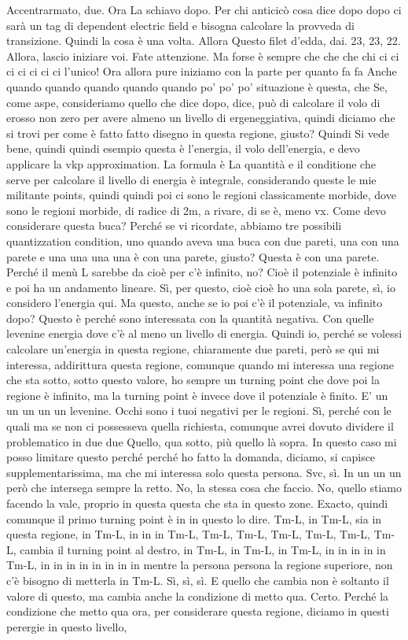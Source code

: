 \begin{soluzione}
   Accentrarmato, due. Ora La schiavo dopo. Per chi anticicò cosa dice dopo dopo ci sarà un tag di dependent electric field e bisogna calcolare la provveda di transizione. Quindi la cosa è una volta. Allora Questo filet d'edda, dai. 23, 23, 22. Allora, lascio iniziare voi. Fate attenzione. Ma forse è sempre che che che chi ci ci ci ci ci ci ci l'unico! Ora allora pure iniziamo con la parte per quanto fa fa Anche quando quando quando quando quando po' po' po' situazione è questa, che Se, come aspe, consideriamo quello che dice dopo, dice, può di calcolare il volo di erosso non zero per avere almeno un livello di ergeneggiativa, quindi diciamo che si trovi per come è fatto fatto disegno in questa regione, giusto? Quindi Si vede bene, quindi quindi esempio questa è l'energia, il volo dell'energia, e devo applicare la vkp approximation. La formula è La quantità e il conditione che serve per calcolare il livello di energia è integrale, considerando queste le mie militante points, quindi quindi poi ci sono le regioni classicamente morbide, dove sono le regioni morbide, di radice di 2m, a rivare, di se è, meno vx. Come devo considerare questa buca? Perché se vi ricordate, abbiamo tre possibili quantizzation condition, uno quando aveva una buca con due pareti, una con una parete e una una una una è con una parete, giusto? Questa è con una parete. Perché il menù L sarebbe da cioè per c'è infinito, no? Cioè il potenziale è infinito e poi ha un andamento lineare. Sì, per questo, cioè cioè ho una sola parete, sì, io considero l'energia qui. Ma questo, anche se io poi c'è il potenziale, va infinito dopo? Questo è perché sono interessata con la quantità negativa. Con quelle levenine energia dove c'è al meno un livello di energia. Quindi io, perché se volessi calcolare un'energia in questa regione, chiaramente due pareti, però se qui mi interessa, addirittura questa regione, comunque quando mi interessa una regione che sta sotto, sotto questo valore, ho sempre un turning point che dove poi la regione è infinito, ma la turning point è invece dove il potenziale è finito. E' un un un un un levenine. Occhi sono i tuoi negativi per le regioni. Sì, perché con le quali ma se non ci possesseva quella richiesta, comunque avrei dovuto dividere il problematico in due due Quello, qua sotto, più quello là sopra. In questo caso mi posso limitare questo perché perché ho fatto la domanda, diciamo, si capisce supplementarissima, ma che mi interessa solo questa persona. Svc, sì. In un un un però che intersega sempre la retto. No, la stessa cosa che faccio. No, quello stiamo facendo la vale, proprio in questa questa che sta in questo zone. Exacto, quindi comunque il primo turning point è in in questo lo dire. Tm-L, in Tm-L, sia in questa regione, in Tm-L, in in in Tm-L, Tm-L, Tm-L, Tm-L, Tm-L, Tm-L, Tm-L, cambia il turning point al destro, in Tm-L, in Tm-L, in Tm-L, in in in in in Tm-L, in in in in in in in in mentre la persona persona la regione superiore, non c'è bisogno di metterla in Tm-L. Sì, sì, sì. E quello che cambia non è soltanto il valore di questo, ma cambia anche la condizione di metto qua. Certo. Perché la condizione che metto qua ora, per considerare questa regione, diciamo in questi perergie in questo livello, 
\end{soluzione}
